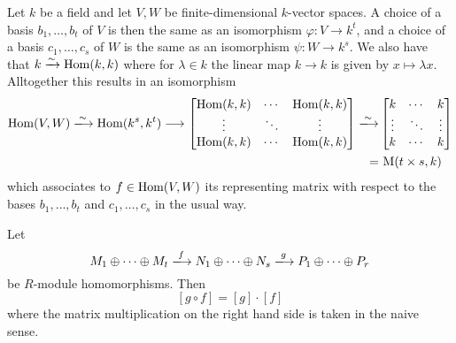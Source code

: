 \begin{example}
  Let $k$ be a field and let $V, W$ be finite-dimensional $k$-vector spaces.
  A choice of a basis $b_1, \dotsc, b_t$ of $V$ is then the same as an isomorphism $\varphi \colon V \to k^t$, and a choice of a basis $c_1, \dotsc, c_s$ of $W$ is the same as an isomorphism $\psi \colon W \to k^s$.
  We also have that $k \xrightarrow{\sim} \operatorname{Hom}(k,k)$ where for $\lambda \in k$ the linear map $k \to k$ is given by $x \mapsto \lambda x$.
  Alltogether this results in an isomorphism
  \begin{align*}
      \Hom(V,W)
    \xlongrightarrow{\sim}
      \Hom(k^s, k^t)
    \longto
      \begin{bmatrix}
        \Hom(k,k) & \cdots  & \Hom(k,k) \\
        \vdots    & \ddots  & \vdots    \\
        \Hom(k,k) & \cdots  & \Hom(k,k)
      \end{bmatrix}
    \xlongrightarrow{\sim}&
      \begin{bmatrix}
        k       & \cdots  & k       \\
        \vdots  & \ddots  & \vdots  \\
        k       & \cdots  & k
      \end{bmatrix}
    \\
    =&\,
      \Mat(t \times s, k)
  \end{align*}
  which associates to $f \in \operatorname{Hom}(V, W)$ its representing matrix with respect to the bases $b_1, \dotsc, b_t$ and $c_1, \dotsc, c_s$ in the usual way.
\end{example}


\begin{proposition}
  \label{proposition: representing matrix is multiplicative}
  Let
  \[
    M_1 \oplus \dotsb \oplus M_t
    \xlongrightarrow{f}
    N_1 \oplus \dotsb \oplus N_s
    \xlongrightarrow{g}
    P_1 \oplus \dotsb \oplus P_r
  \]
  be $R$-module homomorphisms.
  Then
  \[
      [g \circ f]
    = [g] \cdot [f]
  \]
  where the matrix multiplication on the right hand side is taken in the naive sense.
\end{proposition}


